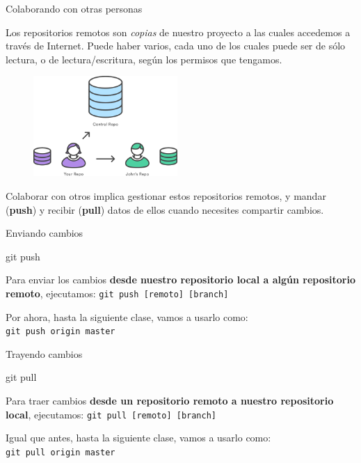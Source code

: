 \begin{frame}{Colaborando con otras personas}

    Los repositorios remotos son \textit{copias} de nuestro proyecto a las cuales accedemos a través
    de Internet. Puede haber varios, cada uno de los cuales
    puede ser de sólo lectura, o de lectura/escritura, según los permisos que tengamos.

    \begin{figure}[ht]
        \begin{center}
            \includegraphics[height=1.5in]{images/repo-remoto.png}
        \end{center}
    \end{figure}

    Colaborar con otros implica gestionar estos repositorios remotos, y mandar (\textbf{push}) y recibir (\textbf{pull})
    datos de ellos cuando necesites compartir cambios.

\end{frame}

\begin{frame}[t]{Enviando cambios}
    \begin{comando}
        git push
    \end{comando}

    \pause
    \begin{block}{}
        Para enviar los cambios \textbf{desde nuestro repositorio local a algún
        repositorio remoto}, ejecutamos: \texttt{git push [remoto] [branch]}

        \vspace{0.5em}

        Por ahora, hasta la siguiente clase, vamos a usarlo como:\\ \texttt{git push origin master}
    \end{block}
\end{frame}

\begin{frame}[t]{Trayendo cambios}
    \begin{comando}
        git pull
    \end{comando}

    \pause
    \begin{block}{}
        Para traer cambios \textbf{desde un repositorio remoto a nuestro repositorio local},
        ejecutamos: \texttt{git pull [remoto] [branch]}

        \vspace{0.5em}

        Igual que antes, hasta la siguiente clase, vamos a usarlo como:\\ \texttt{git pull origin master}
    \end{block}
\end{frame}

